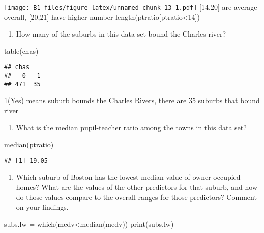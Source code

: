 \documentclass[
]{article}
\newenvironment{Shaded}{\begin{snugshade}}{\end{snugshade}}
\newcommand{\FunctionTok}[1]{\textcolor[rgb]{0.00,0.00,0.00}{#1}}
\newcommand{\NormalTok}[1]{#1}
\newcommand{\OtherTok}[1]{\textcolor[rgb]{0.56,0.35,0.01}{#1}}
\newcommand{\SpecialCharTok}[1]{\textcolor[rgb]{0.00,0.00,0.00}{#1}}
\providecommand{\tightlist}{%
  \setlength{\itemsep}{0pt}\setlength{\parskip}{0pt}}
\begin{document}
\texttt{[image: B1\_files/figure-latex/unnamed-chunk-13-1.pdf]}
{[}14,20{]} are average overall, {[}20,21{]} have higher number
length(ptratio{[}ptratio\textless14{]})

\begin{enumerate}
\def\labelenumi{(\alph{enumi})}
\setcounter{enumi}{4}
\tightlist
\item
  How many of the suburbs in this data set bound the Charles river?
\end{enumerate}

\begin{Shaded}
\begin{Highlighting}[]
\FunctionTok{table}\NormalTok{(chas)}
\end{Highlighting}
\end{Shaded}

\begin{verbatim}
## chas
##   0   1 
## 471  35
\end{verbatim}

1(Yes) means suburb bounds the Charles Rivers, there are 35 suburbs that
bound river

\begin{enumerate}
\def\labelenumi{(\alph{enumi})}
\setcounter{enumi}{5}
\tightlist
\item
  What is the median pupil-teacher ratio among the towns in this data
  set?
\end{enumerate}

\begin{Shaded}
\begin{Highlighting}[]
\FunctionTok{median}\NormalTok{(ptratio)}
\end{Highlighting}
\end{Shaded}

\begin{verbatim}
## [1] 19.05
\end{verbatim}

\begin{enumerate}
\def\labelenumi{(\alph{enumi})}
\setcounter{enumi}{6}
\tightlist
\item
  Which suburb of Boston has the lowest median value of owner-occupied
  homes? What are the values of the other predictors for that suburb,
  and how do those values compare to the overall ranges for those
  predictors? Comment on your findings.
\end{enumerate}

\begin{Shaded}
\begin{Highlighting}[]
\NormalTok{subs.lw }\OtherTok{=} \FunctionTok{which}\NormalTok{(medv}\SpecialCharTok{\textless{}}\FunctionTok{median}\NormalTok{(medv))}
\FunctionTok{print}\NormalTok{(subs.lw)}
\end{Highlighting}
\end{Shaded}
\end{document}
